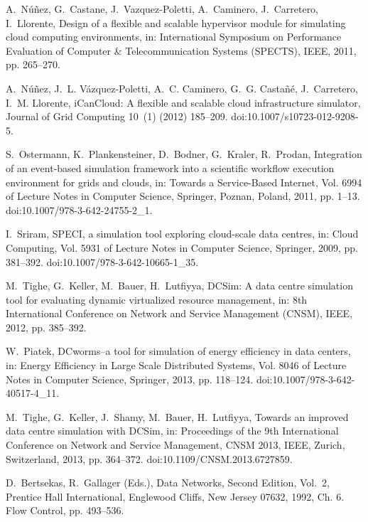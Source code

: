 \documentclass[sort, compress, 5p]{elsarticle}
\begin{document}
\begin{thebibliography}{10}
A.~N{\'u}{\~n}ez, G.~Castane, J.~Vazquez-Poletti, A.~Caminero, J.~Carretero,
  I.~Llorente, Design of a flexible and scalable hypervisor module for
  simulating cloud computing environments, in: International Symposium on
  Performance Evaluation of Computer \& Telecommunication Systems (SPECTS),
  IEEE, 2011, pp. 265--270.

A.~N{\'u}{\~n}ez, J.~L. V{\'a}zquez-Poletti, A.~C. Caminero, G.~G.
  Casta{\~n}{\'e}, J.~Carretero, I.~M. Llorente, {iCanCloud}: A flexible and
  scalable cloud infrastructure simulator, Journal of Grid Computing 10~(1)
  (2012) 185--209.
\newblock doi:10.1007/s10723-012-9208-5.

S.~Ostermann, K.~Plankensteiner, D.~Bodner, G.~Kraler, R.~Prodan, Integration
  of an event-based simulation framework into a scientific workflow execution
  environment for grids and clouds, in: Towards a Service-Based Internet, Vol.
  6994 of Lecture Notes in Computer Science, Springer, Poznan, Poland, 2011,
  pp. 1--13.
\newblock doi:10.1007/978-3-642-24755-2\_1.

I.~Sriram, {SPECI}, a simulation tool exploring cloud-scale data centres, in:
  Cloud Computing, Vol. 5931 of Lecture Notes in Computer Science, Springer,
  2009, pp. 381--392.
\newblock doi:10.1007/978-3-642-10665-1\_35.

M.~Tighe, G.~Keller, M.~Bauer, H.~Lutfiyya, {DCSim}: A data centre simulation
  tool for evaluating dynamic virtualized resource management, in: 8th
  International Conference on Network and Service Management (CNSM), IEEE,
  2012, pp. 385--392.

W.~Piatek, {DCworms}--a tool for simulation of energy efficiency in data
  centers, in: Energy Efficiency in Large Scale Distributed Systems, Vol. 8046
  of Lecture Notes in Computer Science, Springer, 2013, pp. 118--124.
\newblock doi:10.1007/978-3-642-40517-4\_11.

M.~Tighe, G.~Keller, J.~Shamy, M.~Bauer, H.~Lutfiyya, Towards an improved data
  centre simulation with {DCSim}, in: Proceedings of the 9th International
  Conference on Network and Service Management, CNSM 2013, IEEE, Zurich,
  Switzerland, 2013, pp. 364--372.
\newblock doi:10.1109/CNSM.2013.6727859.

D.~Bertsekas, R.~Gallager (Eds.), Data Networks, {Second} Edition, Vol.~2,
  Prentice Hall International, Englewood Cliffs, New Jersey 07632, 1992, Ch. 6.
  Flow Control, pp. 493--536.


\end{thebibliography}
\end{document}
